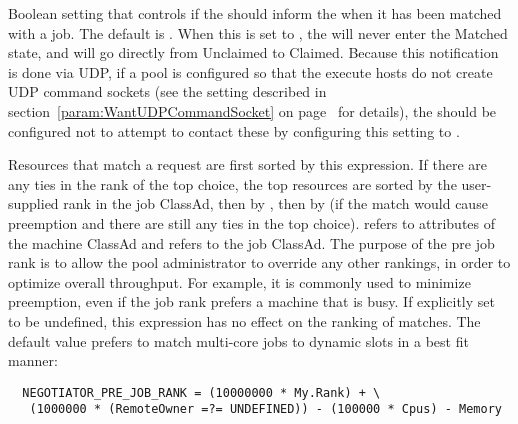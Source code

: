 \begin{description}
\label{param:NegotiatorInformStartd}
\item[\Macro{NEGOTIATOR\_INFORM\_STARTD}]
  Boolean setting that controls if the  should
  inform the  when it has been matched with a job.
  The default is .
  When this is set to , the  will never
  enter the Matched state, and will go directly from Unclaimed to
  Claimed.
  Because this notification is done via UDP, if a pool is configured
  so that the execute hosts do not create UDP command sockets (see the
   setting described in
  section~\ref{param:WantUDPCommandSocket} on
  page~\pageref{param:WantUDPCommandSocket} for details), the
   should be configured not to attempt to contact
  these  by configuring this setting to .

\label{param:NegotiatorPreJobRank}
\item[\Macro{NEGOTIATOR\_PRE\_JOB\_RANK}]
  Resources that match a request
  are first sorted by this expression.  If there are any ties in the
  rank of the top choice, the top resources are sorted by the
  user-supplied rank in the job ClassAd, then by
  , then by
   (if the match would cause preemption and
  there are still any ties in the top choice).  \verb@MY@ refers to
  attributes of the machine ClassAd and \verb@TARGET@ refers to the
  job ClassAd.  The purpose of the pre job rank is to allow the pool
  administrator to override any other rankings, in order to optimize
  overall throughput.  For example, it is commonly used to minimize
  preemption, even if the job rank prefers a machine that is busy.
  If explicitly set to be undefined, 
  this expression has no effect on the ranking of matches.
  The default value prefers to match multi-core jobs to dynamic slots in
  a best fit manner:

\footnotesize
\begin{verbatim}
  NEGOTIATOR_PRE_JOB_RANK = (10000000 * My.Rank) + \
   (1000000 * (RemoteOwner =?= UNDEFINED)) - (100000 * Cpus) - Memory
\end{verbatim}
\normalsize


\end{description}
